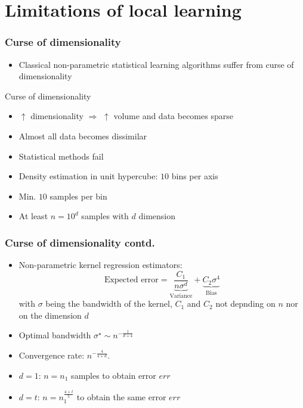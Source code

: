 \section{Limitations of local learning}

\begin{frame}
	\frametitle{Curse of dimensionality}
	\begin{itemize}
		\item Classical non-parametric statistical learning algorithms suffer from curse of dimensionality
	\end{itemize}
	\begin{block}{Curse of dimensionality}
		\begin{itemize}
			\item $\uparrow$ dimensionality $\Rightarrow$ $\uparrow$ volume and data becomes sparse
			\item Almost all data becomes dissimilar
			\item Statistical methods fail
		\end{itemize}
	\end{block}
	
	\begin{example}
		\begin{itemize}
			\item Density estimation in unit hypercube: $10$ bins per axis
			\item Min. $10$ samples per bin
			\item At least $n=10^d$ samples with $d$ dimension
		\end{itemize}	
	\end{example}
\end{frame}

\begin{frame}
	\frametitle{Curse of dimensionality contd.}
	\begin{itemize}
		\item Non-parametric kernel regression estimators:
		\begin{displaymath}
			\text{Expected error} = \underbrace{\frac{C_1}{n\sigma^d}}_{\text{Variance}} + \underbrace{C_2 \sigma^4}_{\text{Bias}}
		\end{displaymath}
		with $\sigma$ being the bandwidth of the kernel, $C_1$ and $C_2$ not depnding on $n$ nor on the dimension $d$ \cite{Haerdle:04}
		\item Optimal bandwidth $\sigma^{\star} \sim n^{-\frac{1}{d+4}}$
		\item Convergence rate: $n^{-\frac{4}{4+d}}$.
	\end{itemize}
	
	\begin{example}
		\begin{itemize}
			\item $d=1$: $n = n_1$ samples to obtain error $err$
			\item $d=t$: $n = n_1^{\frac{4+t}{5}}$ to obtain the same error $err$
		\end{itemize}
	\end{example}
\end{frame}

